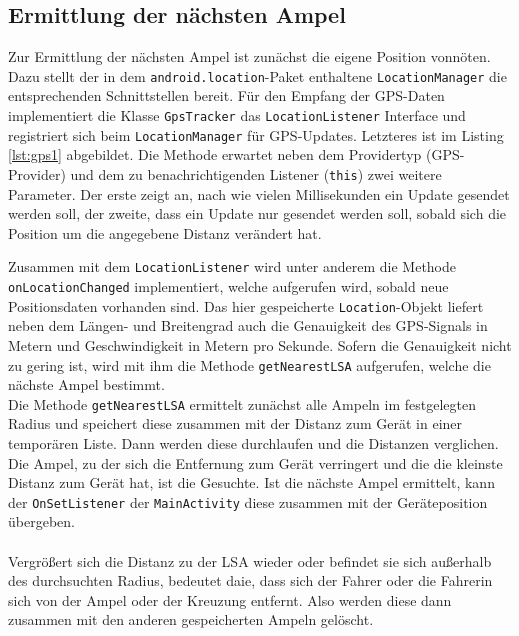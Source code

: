 \subsection{Ermittlung der nächsten Ampel}
Zur Ermittlung der nächsten Ampel ist zunächst die eigene Position vonnöten. Dazu stellt der in dem \texttt{android.location}-Paket enthaltene \texttt{LocationManager} die entsprechenden Schnittstellen bereit. Für den Empfang der \gls{GPS}-Daten implementiert die Klasse \texttt{GpsTracker} das \texttt{LocationListener} Interface und registriert sich beim \texttt{LocationManager} für \gls{GPS}-Updates.
Letzteres ist im Listing \ref{lst:gps1} abgebildet. Die Methode erwartet neben dem Providertyp (\gls{GPS}-Provider) und dem zu benachrichtigenden Listener (\texttt{this}) zwei weitere Parameter. Der erste zeigt an, nach wie vielen Millisekunden ein Update gesendet werden soll, der zweite, dass ein Update nur gesendet werden soll, sobald sich die Position um die angegebene Distanz verändert hat.
\begin{center}
\grayRule

\grayRule
\end{center}
Zusammen mit dem \texttt{LocationListener} wird unter anderem die Methode \texttt{onLocationChanged} implementiert, welche aufgerufen wird, sobald neue Positionsdaten vorhanden sind. Das hier gespeicherte \texttt{Location}-Objekt liefert neben dem Längen- und Breitengrad auch die Genauigkeit des \gls{GPS}-Signals in Metern und Geschwindigkeit in Metern pro Sekunde. Sofern die Genauigkeit nicht zu gering ist, wird mit ihm die Methode \texttt{getNearestLSA} aufgerufen, welche die nächste Ampel bestimmt.\\
Die Methode \texttt{getNearestLSA} ermittelt zunächst alle Ampeln im festgelegten Radius und speichert diese zusammen mit der Distanz zum Gerät in einer temporären Liste. Dann werden diese durchlaufen und die Distanzen verglichen. Die Ampel, zu der sich die Entfernung zum Gerät verringert und die die kleinste Distanz zum Gerät hat, ist die Gesuchte. Ist die nächste Ampel ermittelt, kann der \texttt{OnSetListener} der \texttt{MainActivity} diese zusammen mit der Geräteposition übergeben. \\\\
Vergrößert sich die Distanz zu der \gls{LSA} wieder oder befindet sie sich außerhalb des durchsuchten Radius, bedeutet daie, dass sich der Fahrer oder die Fahrerin sich von der Ampel oder der Kreuzung entfernt. Also werden diese dann zusammen mit den anderen gespeicherten Ampeln gelöscht.\\ 
\begin{center}
\grayRule

\grayRule
\end{center}
%
%
